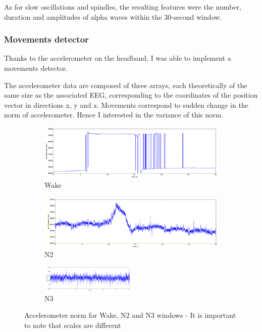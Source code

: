 \documentclass[12pt]{report}
\begin{document}
As for slow oscillations and spindles, the resulting features were the number, duration and amplitudes of alpha waves within the 30-second window.

\subsubsection{Movements detector}

Thanks to the accelerometer on the headband, I was able to implement a movements detector.

The accelerometer data are composed of three arrays, each theoretically of the same size as the associated EEG, corresponding to the coordinates of the position vector in directions x, y and z. Movements correspond to sudden change in the norm of accelerometer. Hence I interested in the variance of this norm.

 \begin{figure}[H]
 \begin{subfigure}{0.5\textwidth}
 	\centering
 	\includegraphics[width=1\textwidth]{img/chap2/wake_accnorm.png}
 	\caption{Wake}
 	\label{fig:wake_accnorm}
 \end{subfigure}
 \begin{subfigure}{0.5\textwidth}
 	\centering
 	\includegraphics[width=1\textwidth]{img/chap2/n2_accnorm.png}
 	\caption{N2}
 	\label{fig:n2_accnorm}
 \end{subfigure}
 \begin{subfigure}{1\textwidth}
 	\centering
 	\includegraphics[width=0.5\textwidth]{img/chap2/n3_accnorm.png}
 	\caption{N3}
 	\label{fig:n3_accnorm}
 \end{subfigure}
 
 \caption{\label{fig:3winsows_accnorm}Accelerometer norm for Wake, N2 and N3 windows - It is important to note that scales are different}
 \end{figure}
\end{document}
